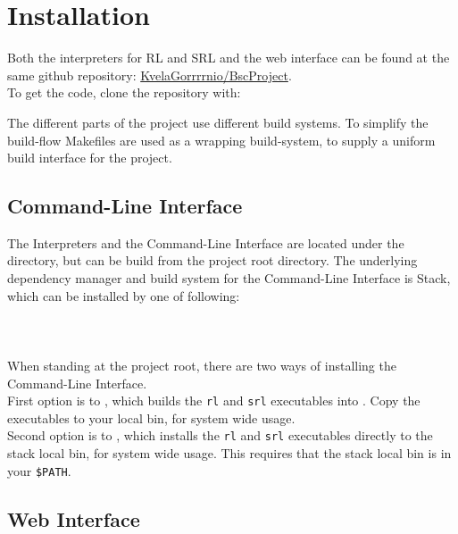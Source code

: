\section*{Installation}
%

Both the interpreters for RL and SRL and the web interface can be found at the same github repository: \href{https://github.com/KvelaGorrrrnio/BscProject}{KvelaGorrrrnio/BscProject}.\\
To get the code, clone the repository with:

The different parts of the project use different build systems. To simplify the build-flow Makefiles are used as a wrapping build-system, to supply a uniform build interface for the project.

\subsection*{Command-Line Interface}
%
The Interpreters and the Command-Line Interface are located under the  directory, but can be build from the project root directory.
The underlying dependency manager and build system for the Command-Line Interface is Stack, which can be installed by one of following:\\
\\
\\
\\

\noindent
When standing at the project root, there are two ways of installing the Command-Line Interface.\\
First option is to , which builds the \texttt{rl} and \texttt{srl} executables into . Copy the executables to your local bin, for system wide usage.\\
Second option is to , which installs the \texttt{rl} and \texttt{srl} executables directly to the stack local bin, for system wide usage. This requires that the stack local bin is in your \texttt{\$PATH}.

\subsection*{Web Interface}
%

